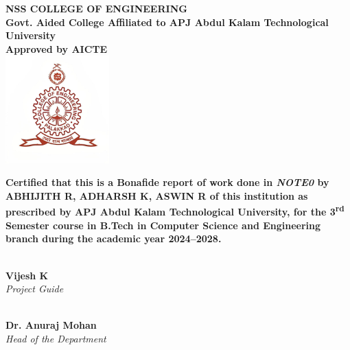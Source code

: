 \documentclass[12pt, a4paper]{report}
\begin{document}
\begin{center}
    \textbf{\LARGE NSS COLLEGE OF ENGINEERING}\\[0.3cm]
    \Large
    \textbf{Govt. Aided College Affiliated to APJ Abdul Kalam Technological University}\\[0.3cm]
    \textbf{Approved by AICTE}\\[1cm]

    \includegraphics[width=0.3\textwidth]{images/NSS_LOGO.jpg} %
    
    \vspace{1cm} %
    
    \parbox{0.9\textwidth}{
        \centering
        \textbf{Certified that this is a Bonafide report of work done in \textit{NOTE0} by \textbf{ABHIJITH R, ADHARSH K, ASWIN R} of this institution as prescribed by APJ Abdul Kalam Technological University, for the 3\textsuperscript{rd} Semester course in B.Tech in Computer Science and Engineering branch during the academic year 2024--2028.}
    }
\end{center}

\vfill %

\noindent %
\begin{minipage}[t]{0.5\textwidth} %
    \centering
    \vspace{2cm} %
    \dotfill \\ %
    \textbf{Vijesh K} \\
    \textit{Project Guide}
\end{minipage}%
\begin{minipage}[t]{0.5\textwidth} %
    \centering
    \vspace{2cm} %
    \dotfill \\ %
    \textbf{Dr. Anuraj Mohan} \\
    \textit{Head of the Department}
\end{minipage}
\end{document}
